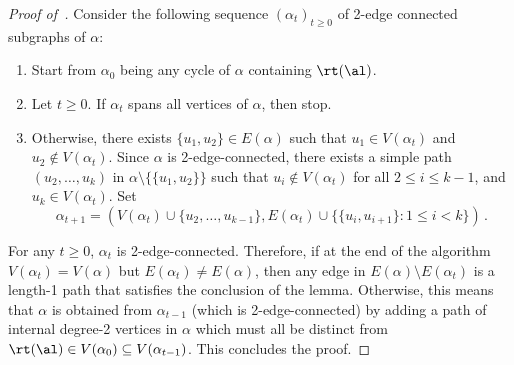\begin{proof}[Proof of~]
    Consider the following sequence $(\alpha_t)_{t\ge 0}$ of 2-edge connected subgraphs of $\alpha$:
    \begin{enumerate}
        \item Start from $\alpha_0$ being 
        any cycle of $\alpha$ containing $\rt(\al)$.
        \item Let $t\ge 0$. If $\alpha_t$ spans all vertices of $\alpha$, then stop.
        \item Otherwise, there exists
        $\{u_1,u_2\}\in E(\alpha)$ such that $u_1\in V(\alpha_t)$ and $u_2\notin V(\alpha_t)$. Since $\alpha$ is
        2-edge-connected, there exists a
        simple path
        $(u_2, \ldots, u_k)$ in $\alpha\setminus\{\{u_1,u_2\}\}$
        such that
        $u_i\notin V(\alpha_t)$ for all $2\le i\le k-1$, and $u_k\in V(\alpha_t)$.
        Set 
        \[
            \alpha_{t+1}=(V(\alpha_t)\cup \{u_2, \ldots, u_{k-1}\}, E(\alpha_t) \cup \{\{u_i,u_{i+1}\} : 1\le i<k\})\,.
        \]
    \end{enumerate}
    For any $t\ge 0$, $\alpha_t$ is 2-edge-connected.
    Therefore, if at the end of the algorithm $V(\alpha_t)=V(\alpha)$ but $E(\alpha_t)\neq E(\alpha)$, then any
    edge in $E(\alpha)\setminus E(\alpha_t)$
    is a length-1 path that satisfies the conclusion of the lemma.
    Otherwise, this means that $\alpha$ is
    obtained from
    $\alpha_{t-1}$ (which is 2-edge-connected) by adding a path of
    internal degree-2 vertices in $\alpha$
    which must all 
    be distinct from $\rt(\al)\in V(\alpha_0)\subseteq V(\alpha_{t-1})$. This concludes the proof.
\end{proof}


